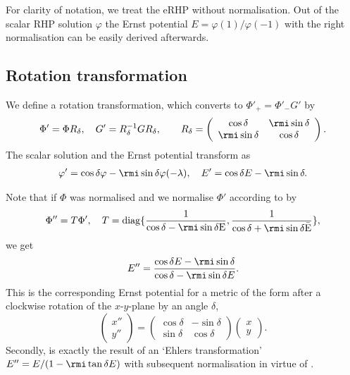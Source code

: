 \documentclass[12pt]{iopart}
\begin{document}
For clarity of notation, we treat the eRHP without normalisation. Out of the scalar RHP solution $\varphi$ the Ernst potential $E=\varphi(1)/\varphi(-1)$ with the right normalisation  can be easily derived afterwards.


\subsection{Rotation transformation}

We define a rotation transformation, which converts  to $\Phi'_+=\Phi'_- G'$ by
\begin{eqnarray}
\Phi'=\Phi R_\delta, \quad G'=R_\delta^{-1}G R_\delta, \quad\quad R_\delta=\left(\begin{array}{cc}
\cos{\delta} & \rmi \sin{\delta} \\
\rmi \sin{\delta} & \cos{\delta} 
\end{array}\right).\label{x-y-Rotation}
\end{eqnarray}
The scalar solution and the Ernst potential transform as 
\begin{eqnarray}
\varphi'=\cos{\delta}\varphi-\rmi\sin{\delta}\varphi(-\lambda), \quad 
E'=\cos{\delta}E-\rmi\sin{\delta}. \label{eq:xy-RotationSkalar}
\end{eqnarray}

Note that if $\Phi$ was normalised and we normalise $\Phi'$ according to  by
\begin{eqnarray}
\Phi''=T\Phi', \quad T=\rm{diag}\lbrace
\frac{1}{\cos{\delta}-\rmi\sin{\delta}E} , \frac{1}{\cos{\delta}+\rmi\sin{\delta}\bar{E}}\rbrace,
\end{eqnarray}
we get 
\begin{equation} \label{Estrichstrich}
E''=\frac{\cos{\delta}E-\rmi\sin{\delta}}{\cos{\delta}-\rmi\sin{\delta}E}. 
\end{equation}
This is the corresponding Ernst potential for a metric of the form  after a clockwise rotation of the $x$-$y$-plane by an angle $\delta$,
 \begin{equation}
\left(\begin{array}{c} x'' \\ y'' \end{array}\right) =
\left(\begin{array}{cc}
\cos{\delta} & -\sin{\delta} \\
 \sin{\delta} & \cos{\delta}
\end{array}\right)
\left(\begin{array}{c} x \\ y \end{array}\right).
\end{equation}
Secondly,  is exactly the result of an `Ehlers transformation' $E''=E/(1-\rmi\tan{\delta}E)$ with subsequent normalisation in virtue of .  
\end{document}
